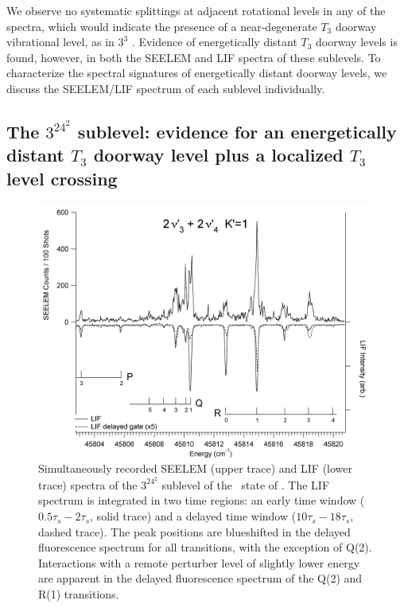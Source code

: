\documentclass[12pt]{mitthesis}
\begin{document}
We observe no systematic splittings at adjacent rotational levels in
any of the spectra, which would indicate the presence of a
near-degenerate $T_3$ doorway vibrational level, as in $3^3$ 
\cite{mishra04}.  Evidence of energetically distant $T_3$ doorway
levels is found, however, in both the SEELEM and LIF spectra of these
sublevels.  To characterize the spectral signatures of energetically
distant doorway levels, we discuss the SEELEM/LIF spectrum of each
sublevel individually.


\subsection{The $3^24^2$  sublevel: evidence for an
  energetically distant $T_3$ doorway level plus a localized $T_3$
  level crossing}




\begin{figure}
  \caption{Simultaneously recorded SEELEM (upper trace) and LIF (lower
    trace) spectra of the $3^24^2$  sublevel of the \astate\
    state of .  The LIF spectrum is integrated in two time
    regions: an early time window ($0.5\tau_s-2\tau_s$, solid trace)
    and a delayed time window ($10\tau_s-18\tau_s$, dashed trace).
    The peak positions are blueshifted in the delayed fluorescence
    spectrum for all transitions, with the exception of Q(2).
    Interactions with a remote perturber level of slightly lower
    energy are apparent in the delayed fluorescence spectrum of the
    Q(2) and R(1) transitions.}
  \label{fig:spectrum-32b2}
  \centering
  \includegraphics[width=7in,angle=90]{acetylene-32b2-p3r4.png}
\end{figure}
\end{document}
